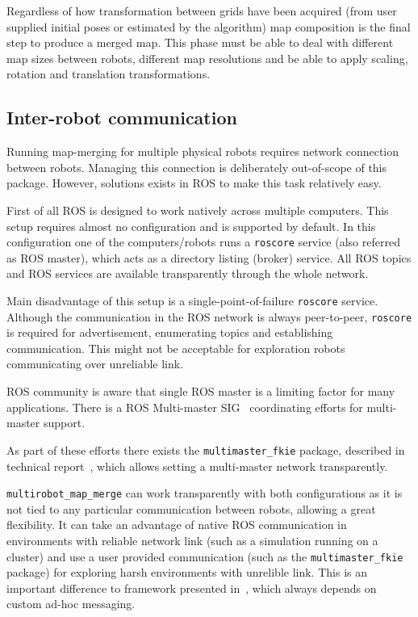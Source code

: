 Regardless of how transformation between grids have been acquired (from user supplied initial poses or estimated by the algorithm) map composition is the final step to produce a merged map. This phase must be able to deal with different map sizes between robots, different map resolutions and be able to apply scaling, rotation and translation transformations.

\subsection{Inter-robot communication}

Running map-merging for multiple physical robots requires network connection between robots. Managing this connection is deliberately out-of-scope of this package. However, solutions exists in \gls{ROS} to make this task relatively easy.

First of all \gls{ROS} is designed to work natively across multiple computers. This setup requires almost no configuration and is supported by default. In this configuration one of the computers/robots runs a \texttt{roscore} service (also referred as \gls{ROS} master), which acts as a directory listing (broker) service. All \gls{ROS} topics and \gls{ROS} services are available transparently through the whole network.

Main disadvantage of this setup is a single-point-of-failure \texttt{roscore} service. Although the communication in the \gls{ROS} network is always peer-to-peer, \texttt{roscore} is required for advertisement, enumerating topics and establishing communication. This might not be acceptable for exploration robots communicating over unreliable link.

\gls{ROS} community is aware that single \gls{ROS} master is a limiting factor for many applications. There is a \gls{ROS} Multi-master \gls{SIG}~\cite{MultiMasterSIG} coordinating efforts for multi-master support.

As part of these efforts there exists the \texttt{multimaster\_fkie} package, described in technical report~\cite{herrero2015multimaster}, which allows setting a multi-master network transparently.

\texttt{multirobot\_map\_merge} can work transparently with both configurations as it is not tied to any particular communication between robots, allowing a great flexibility. It can take an advantage of native \gls{ROS} communication in environments with reliable network link (such as a simulation running on a cluster) and use a user provided communication (such as the \texttt{multimaster\_fkie} package) for exploring harsh environments with unrelible link. This is an important difference to framework presented in~\cite{Andre2014}, which always depends on custom ad-hoc messaging.

